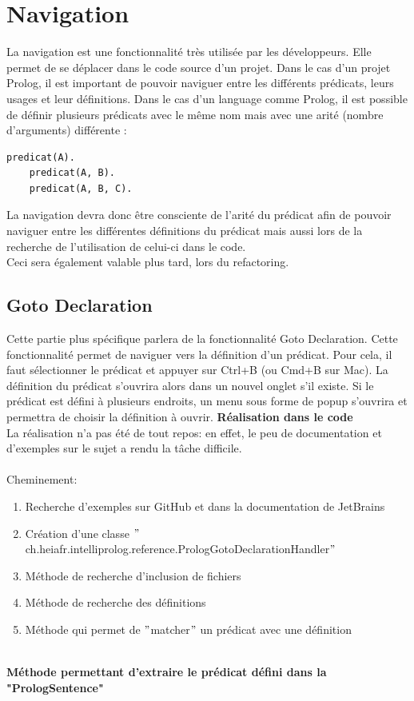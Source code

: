 \section{Navigation}
\noindent La navigation est une fonctionnalité très utilisée par les développeurs.
Elle permet de se déplacer dans le code source d'un projet.
Dans le cas d'un projet Prolog, il est important de pouvoir naviguer entre les différents prédicats, leurs usages et leur définitions.
\newdoubleline
Dans le cas d'un language comme Prolog, il est possible de définir plusieurs prédicats avec le même nom mais avec une arité (nombre d'arguments) différente :

\begin{lstlisting}[caption={Exemple de prédicats nommés pareillement}, label={lst:example_prolog_names}]
    predicat(A).
    predicat(A, B).
    predicat(A, B, C).
\end{lstlisting}

\noindent La navigation devra donc être consciente de l'arité du prédicat afin de pouvoir naviguer entre les différentes définitions du prédicat mais aussi lors de la recherche de l'utilisation de celui-ci dans le code.
\\ Ceci sera également valable plus tard, lors du refactoring.

\subsection{Goto Declaration}
\noindent Cette partie plus spécifique parlera de la fonctionnalité Goto Declaration.
Cette fonctionnalité permet de naviguer vers la définition d'un prédicat.
Pour cela, il faut sélectionner le prédicat et appuyer sur Ctrl+B (ou Cmd+B sur Mac).
La définition du prédicat s'ouvrira alors dans un nouvel onglet s'il existe.
Si le prédicat est défini à plusieurs endroits, un menu sous forme de popup s'ouvrira et permettra de choisir la définition à ouvrir.
\newdoubleline
\noindent \textbf{Réalisation dans le code}
\\
\noindent La réalisation n'a pas été de tout repos: en effet, le peu de documentation et d'exemples sur le sujet a rendu la tâche difficile.
\\
\\

\noindent Cheminement:
\begin{enumerate}
    \item Recherche d'exemples sur GitHub et dans la documentation de JetBrains
    \item Création d'une classe \("\)ch.heiafr.intelliprolog.reference.PrologGotoDeclarationHandler\("\)
    \item Méthode de recherche d'inclusion de fichiers
    \item Méthode de recherche des définitions
    \item Méthode qui permet de \("\)matcher\("\) un prédicat avec une définition
\end{enumerate}
\\
\noindent \textbf{Méthode permettant d'extraire le prédicat défini dans la "PrologSentence"}

